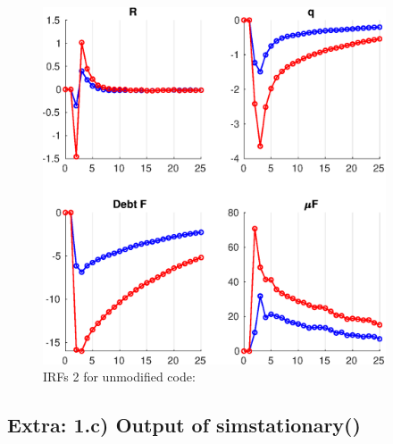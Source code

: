 \documentclass{article}
\begin{document}
\begin{figure}
\caption{IRFs 2 for unmodified code:}
\includegraphics [width=4in]{PS03_projection_code_modif/Results/GR_orig_diff_IRF2.eps}
\end{figure}



\subsection*{Extra: 1.c) Output of sim\textunderscore stationary()}
\end{document}
